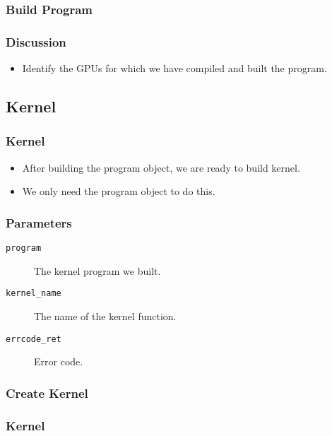 \documentclass{beamer}
\begin{document}
\begin{frame}
  \frametitle{Build Program}
\end{frame}

\begin{frame}
  \frametitle{Discussion}
  \begin{itemize}
  \item Identify the GPUs for which we have compiled and built the
    program.
  \end{itemize}
\end{frame}

\subsection{Kernel}

\begin{frame}
  \frametitle{Kernel}
  \begin{itemize}
  \item After building the program object, we are ready to build
    kernel.
  \item We only need the program object to do this.
  \end{itemize}
\end{frame}

\begin{frame}
\end{frame}

\begin{frame}
  \frametitle{Parameters}
  \begin{description}
  \item [\tt program] The kernel program we built.
  \item [\tt kernel\_name] The name of the kernel function.
  \item [\tt errcode\_ret] Error code.
  \end{description}
\end{frame}

\begin{frame}
  \frametitle{Create Kernel}
\end{frame}

\begin{frame}
  \frametitle{Kernel}
  \centerline{}
\end{frame}
\end{document}
